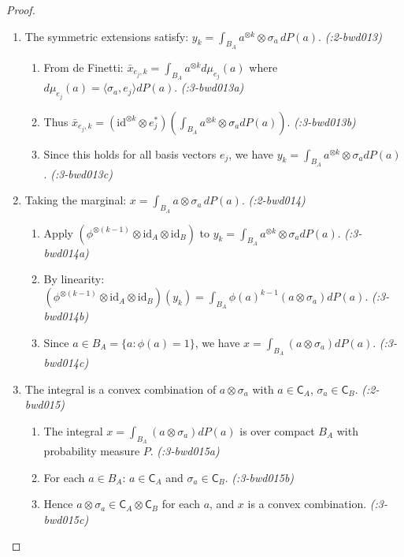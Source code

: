 \documentclass[11pt,a4paper]{article}
\theoremstyle{definition}
\theoremstyle{plain}
\newcommand{\proofstep}[2]{\item[$\langle #1 \rangle$#2.]}
\newcommand{\C}{\mathsf{C}}
\begin{document}
\begin{proof}
\begin{enumerate}[leftmargin=2em]
\proofstep{1}{13} The symmetric extensions satisfy: $y_k = \int_{B_A} a^{\otimes k} \otimes \sigma_a \, dP(a)$. \textit{(:2-bwd013)}
\begin{enumerate}[leftmargin=1.5em, label=$\langle 2.\alph* \rangle$]
\item From de Finetti: $\bar{x}_{e_j,k} = \int_{B_A} a^{\otimes k} d\mu_{e_j}(a)$ where $d\mu_{e_j}(a) = \langle \sigma_a, e_j \rangle dP(a)$. \textit{(:3-bwd013a)}
\item Thus $\bar{x}_{e_j,k} = (\mathrm{id}^{\otimes k} \otimes e_j^*)\left(\int_{B_A} a^{\otimes k} \otimes \sigma_a dP(a)\right)$. \textit{(:3-bwd013b)}
\item Since this holds for all basis vectors $e_j$, we have $y_k = \int_{B_A} a^{\otimes k} \otimes \sigma_a dP(a)$. \textit{(:3-bwd013c)}
\end{enumerate}

\proofstep{1}{14} Taking the marginal: $x = \int_{B_A} a \otimes \sigma_a \, dP(a)$. \textit{(:2-bwd014)}
\begin{enumerate}[leftmargin=1.5em, label=$\langle 2.\alph* \rangle$]
\item Apply $(\phi^{\otimes(k-1)} \otimes \mathrm{id}_A \otimes \mathrm{id}_B)$ to $y_k = \int_{B_A} a^{\otimes k} \otimes \sigma_a dP(a)$. \textit{(:3-bwd014a)}
\item By linearity: $(\phi^{\otimes(k-1)} \otimes \mathrm{id}_A \otimes \mathrm{id}_B)(y_k) = \int_{B_A} \phi(a)^{k-1}(a \otimes \sigma_a) dP(a)$. \textit{(:3-bwd014b)}
\item Since $a \in B_A = \{a : \phi(a) = 1\}$, we have $x = \int_{B_A} (a \otimes \sigma_a) dP(a)$. \textit{(:3-bwd014c)}
\end{enumerate}

\proofstep{1}{15} The integral is a convex combination of $a \otimes \sigma_a$ with $a \in \C_A$, $\sigma_a \in \C_B$. \textit{(:2-bwd015)}
\begin{enumerate}[leftmargin=1.5em, label=$\langle 2.\alph* \rangle$]
\item The integral $x = \int_{B_A} (a \otimes \sigma_a) dP(a)$ is over compact $B_A$ with probability measure $P$. \textit{(:3-bwd015a)}
\item For each $a \in B_A$: $a \in \C_A$ and $\sigma_a \in \C_B$. \textit{(:3-bwd015b)}
\item Hence $a \otimes \sigma_a \in \C_A \otimes \C_B$ for each $a$, and $x$ is a convex combination. \textit{(:3-bwd015c)}
\end{enumerate}


\end{enumerate}
\end{proof}
\end{document}
